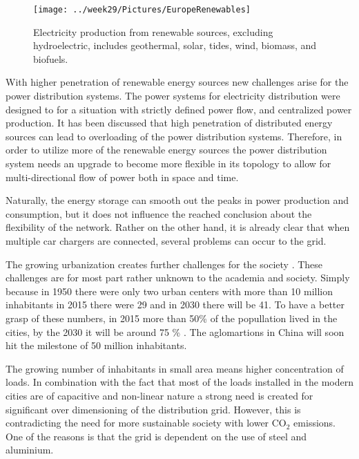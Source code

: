 \documentclass[]{scrartcl}
\begin{document}
\begin{figure}[h!]
	\centering
	\texttt{[image: ../week29/Pictures/EuropeRenewables]}
	\caption{Electricity production from renewable sources, excluding hydroelectric, includes geothermal, solar, tides, wind, biomass, and biofuels.}
	\label{fig:europerenewables}
\end{figure}


With higher penetration of renewable energy sources new challenges arise for the power distribution systems. The power systems for electricity distribution were designed to for a situation with strictly defined power flow, and centralized power production.  It has been discussed that high penetration of distributed energy sources can lead to overloading of the power distribution systems\cite{Garrity2009}.
Therefore, in order to utilize more of the renewable energy sources the power distribution system needs an upgrade to become more flexible in its topology to allow for multi-directional flow of power both in space and time\cite{Doncker2014}. 


Naturally, the energy storage can smooth out the peaks in power production and consumption\cite{Luo2015}, but it does not influence the reached conclusion about the flexibility of the network. Rather on the other hand, it is already clear that when multiple car chargers are connected, several problems can occur to the grid\cite{Zhou2015}. 

The growing urbanization creates further challenges for the society \cite{Pulse2015}. These challenges are for most part rather unknown to the academia and society.  Simply because in 1950 there were only two urban centers with more than 10 million inhabitants in 2015 there were 29 and in 2030 there will be 41\cite{Pulse2015}. To have a better grasp of these numbers, in 2015 more than 50\% of the popullation lived in the cities, by the 2030 it will be around 75 \% \cite{Pulse2015}. The aglomartions in China will soon hit the milestone of 50 million inhabitants.  




The growing number of inhabitants in small area means higher concentration of loads\cite{Garrity2009}. In combination with the fact that most of the loads installed in the modern cities are of capacitive and non-linear nature\cite{Boroyevich2007} a strong need is created for significant over dimensioning of the distribution grid. However, this is contradicting the need for more sustainable society with lower $\text{CO}_2$ emissions. One of the reasons is that the grid is dependent on the use of steel and aluminium\cite{Allwood2012}. 
\end{document}
